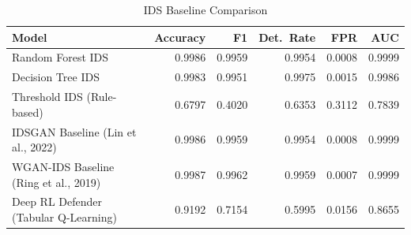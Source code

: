 \begin{table}[ht]
\centering
\caption{IDS Baseline Comparison}
\begin{tabular}{lrrrrr}
\toprule
Model & Accuracy & F1 & Det.\ Rate & FPR & AUC \\
\midrule
Random Forest IDS & 0.9986 & 0.9959 & 0.9954 & 0.0008 & 0.9999 \\
Decision Tree IDS & 0.9983 & 0.9951 & 0.9975 & 0.0015 & 0.9986 \\
Threshold IDS (Rule-based) & 0.6797 & 0.4020 & 0.6353 & 0.3112 & 0.7839 \\
IDSGAN Baseline (Lin et al., 2022) & 0.9986 & 0.9959 & 0.9954 & 0.0008 & 0.9999 \\
WGAN-IDS Baseline (Ring et al., 2019) & 0.9987 & 0.9962 & 0.9959 & 0.0007 & 0.9999 \\
Deep RL Defender (Tabular Q-Learning) & 0.9192 & 0.7154 & 0.5995 & 0.0156 & 0.8655 \\
\bottomrule
\end{tabular}
\end{table}